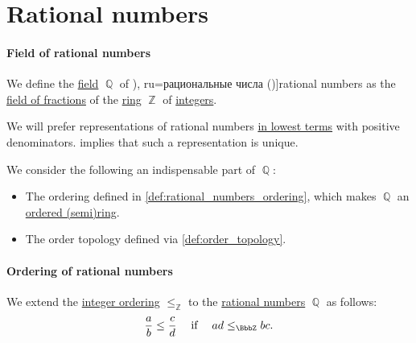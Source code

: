 \section{Rational numbers}\label{sec:rational_numbers}

\paragraph{Field of rational numbers}

\begin{definition}\label{def:rational_numbers}
  We define the \hyperref[def:field]{field} \( \BbbQ \) of \term[bg=рационални числа (\cite[18]{Тагамлицки1971ДиференциалноСмятане}), ru=рациональные числа (\cite[def. 22.1]{АлександровМаркушевичХинчинИПр1951ЭнциклопедияТом1})]{rational numbers} as the \hyperref[def:field_of_fractions]{field of fractions} of the \hyperref[def:ring]{ring} \( \BbbZ \) of \hyperref[def:integers]{integers}.
\end{definition}
\begin{comments}
  \item We will prefer representations of rational numbers \hyperref[def:lowest_terms]{in lowest terms} with positive denominators.  implies that such a representation is unique.

  \item We consider the following an indispensable part of \( \BbbQ \):
  \begin{itemize}
    \item The ordering defined in \cref{def:rational_numbers_ordering}, which makes \( \BbbQ \) an \hyperref[def:ordered_semiring]{ordered (semi)ring}.
    \item The order topology defined via \cref{def:order_topology}.
  \end{itemize}
\end{comments}

\paragraph{Ordering of rational numbers}

\begin{definition}\label{def:rational_numbers_ordering}
  We extend the \hyperref[def:integer_ordering]{integer ordering} \( \leq_\BbbZ \) to the \hyperref[def:rational_numbers]{rational numbers} \( \BbbQ \) as follows:
  \begin{equation*}
    \frac a b \leq \frac c d \quad\T{if}\quad ad \leq_\BbbZ bc.
  \end{equation*}
\end{definition}

